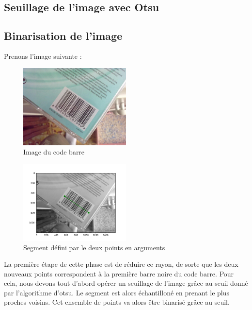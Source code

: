 \documentclass{rapport}
\begin{document}
\subsection{Seuillage de l'image avec Otsu}

\subsection{Binarisation de l'image}

Prenons l'image suivante :

\begin{figure}[H] %
	\centering
	\includegraphics[width=0.5\textwidth]{images/barcode0.jpg}
	\caption{Image du code barre}
\end{figure}

\begin{figure}[H] %
	\centering
	\includegraphics[width=0.5\textwidth]{images/code_barre_couple_vert.png}
	\caption{Segment défini par le deux points en arguments}
\end{figure}

La première étape de cette phase est de réduire ce rayon, de sorte que les deux nouveaux points correspondent à la première barre noire du code barre.
Pour cela, nous devons tout d'abord opérer un seuillage de l'image grâce au seuil donné par l'algorithme d'otsu.
Le segment est alors échantilloné en prenant le plus proches voisins. 
Cet ensemble de points va alors être binarisé grâce au seuil.
\end{document}
